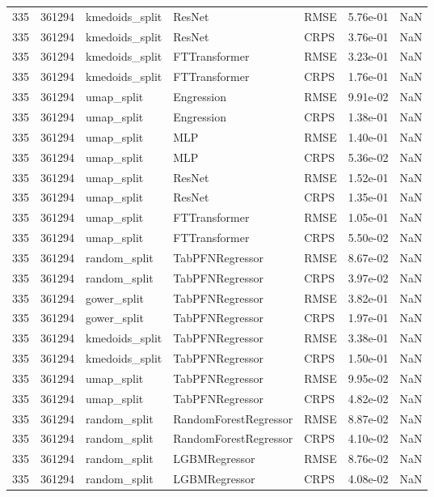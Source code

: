 \begin{tabular}{rrlllrr}
335 & 361294 & kmedoids\_split & ResNet & RMSE & 5.76e-01 & NaN \\
335 & 361294 & kmedoids\_split & ResNet & CRPS & 3.76e-01 & NaN \\
335 & 361294 & kmedoids\_split & FTTransformer & RMSE & 3.23e-01 & NaN \\
335 & 361294 & kmedoids\_split & FTTransformer & CRPS & 1.76e-01 & NaN \\
335 & 361294 & umap\_split & Engression & RMSE & 9.91e-02 & NaN \\
335 & 361294 & umap\_split & Engression & CRPS & 1.38e-01 & NaN \\
335 & 361294 & umap\_split & MLP & RMSE & 1.40e-01 & NaN \\
335 & 361294 & umap\_split & MLP & CRPS & 5.36e-02 & NaN \\
335 & 361294 & umap\_split & ResNet & RMSE & 1.52e-01 & NaN \\
335 & 361294 & umap\_split & ResNet & CRPS & 1.35e-01 & NaN \\
335 & 361294 & umap\_split & FTTransformer & RMSE & 1.05e-01 & NaN \\
335 & 361294 & umap\_split & FTTransformer & CRPS & 5.50e-02 & NaN \\
335 & 361294 & random\_split & TabPFNRegressor & RMSE & 8.67e-02 & NaN \\
335 & 361294 & random\_split & TabPFNRegressor & CRPS & 3.97e-02 & NaN \\
335 & 361294 & gower\_split & TabPFNRegressor & RMSE & 3.82e-01 & NaN \\
335 & 361294 & gower\_split & TabPFNRegressor & CRPS & 1.97e-01 & NaN \\
335 & 361294 & kmedoids\_split & TabPFNRegressor & RMSE & 3.38e-01 & NaN \\
335 & 361294 & kmedoids\_split & TabPFNRegressor & CRPS & 1.50e-01 & NaN \\
335 & 361294 & umap\_split & TabPFNRegressor & RMSE & 9.95e-02 & NaN \\
335 & 361294 & umap\_split & TabPFNRegressor & CRPS & 4.82e-02 & NaN \\
335 & 361294 & random\_split & RandomForestRegressor & RMSE & 8.87e-02 & NaN \\
335 & 361294 & random\_split & RandomForestRegressor & CRPS & 4.10e-02 & NaN \\
335 & 361294 & random\_split & LGBMRegressor & RMSE & 8.76e-02 & NaN \\
335 & 361294 & random\_split & LGBMRegressor & CRPS & 4.08e-02 & NaN \\

\end{tabular}
